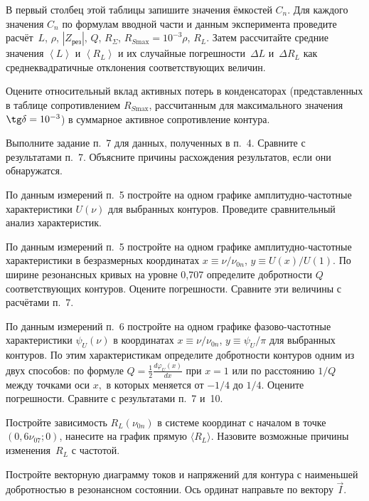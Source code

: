 \begin{lab:task}
В первый столбец этой таблицы запишите значения ёмкостей $C_n$. 
Для каждого значения $C_n$ по формулам вводной части и данным 
эксперимента проведите  расчёт~$L$, 
$\rho$, $|Z_{\text{рез}}|$, $Q$, $R_{\Sigma}$, 
$R_{S \text{max}}=10^{-3}\rho$, $R_L$.
Затем рассчитайте средние значения $\left< L \right>$ и $\left< R_L \right>$ 
и их случайные погрешности~$\Delta L$ и~$\Delta R_L$
как среднеквадратичные отклонения соответствующих величин.


Оцените относительный вклад активных потерь в конденсаторах 
(представленных в таблице сопротивлением $R_{S\text{max}}$, рассчитанным для
максимального значения $\tg\delta=10^{-3}$) в суммарное активное сопротивление
контура.

\item *Выполните задание п.~7 для данных,
полученных в п.~4. Сравните с результатами п.~7. Объясните причины расхождения
результатов, если они обнаружатся.

\item По данным измерений п.~5 постройте на одном графике амплитудно-частотные
характеристики $U(\nu)$  для выбранных контуров. Проведите сравнительный 
анализ характеристик.

\item По данным измерений п.~5 постройте на одном графике амплитудно-частотные
характеристики в безразмерных координатах $x\equiv \nu/\nu_{0n}$, $y\equiv
U(x)/U(1).$ По ширине резонансных кривых на уровне 0,707 определите добротности
$Q$ соответствующих контуров. Оцените погрешности. Сравните эти величины с
расчётами п.~7.

\item По данным измерений п.~6 постройте на одном графике фазово-частотные
характеристики $\psi_U(\nu)$ в координатах $x\equiv \nu/\nu_{0n}$, $y\equiv\psi_U/\pi$
для выбранных контуров. По этим характеристикам определите добротности контуров
одним из двух способов: по формуле $Q=\frac12 \frac{d\varphi_U(x)}{dx}$ при $x=1$ или по
расстоянию $1/Q$ между точками оси $x,$ в которых  меняется от $-1/4$ до $1/4$. 
Оцените погрешности. Сравните с результатами п.~7 и~10.

\item Постройте зависимость $R_L(\nu_{0n})$ в системе координат с началом 
в точке $(0,6\nu_{07};0)$, нанесите на график прямую $\langle R_L \rangle$. 
Назовите возможные причины изменения~$R_L$ с частотой.

\item Постройте векторную диаграмму токов и напряжений для контура 
с наименьшей добротностью в резонансном состоянии. Ось ординат направьте по 
вектору $\vec{I}$.
\end{lab:task}


